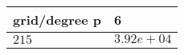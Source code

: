 \begin{tabular}{ll}
\hline
 grid/degree p   & 6          \\
\hline
 $215$           & $3.92e+04$ \\
\hline
\end{tabular}